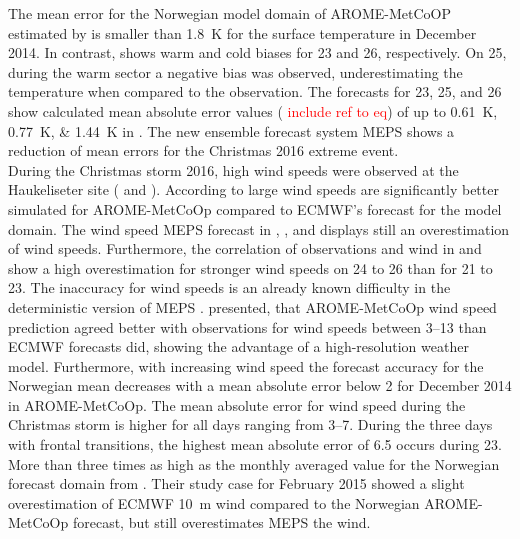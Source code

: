 The mean error for the Norwegian model domain of AROME-MetCoOP estimated by \citet{muller_arome-metcoop:_2017} is smaller than \SI{1.8}{\kelvin} for the surface temperature in December 2014. In contrast,  shows warm and cold biases for \num{23} and \SI{26}{\dec}, respectively. On \SI{25}{\dec}, during the warm sector a negative bias was observed, underestimating the temperature when compared to the observation.  The forecasts for \num{23}, \num{25}, and \SI{26}{\dec} show calculated mean absolute error values ( \textcolor{red}{include ref to eq}) of up to \SIlist{0.61;0.77;1.44}{\kelvin} in . The new ensemble forecast system MEPS shows a reduction of mean errors for the Christmas 2016 extreme event. 
\\
During the Christmas storm 2016, high wind speeds were observed at the Haukeliseter site ( and ).
According to \citet{muller_arome-metcoop:_2017} large wind speeds are significantly better simulated for AROME-MetCoOp compared to ECMWF's forecast for the model domain. The wind speed MEPS forecast in , , and  displays still an overestimation of wind speeds. Furthermore, the correlation of observations and wind in  and  show a high overestimation for stronger wind speeds on \num{24} to \SI{26}{\dec} than for \num{21} to \SI{23}{\dec}. The inaccuracy for wind speeds is an already known difficulty in the deterministic version of MEPS \citep{muller_arome-metcoop:_2017}. \citet{muller_arome-metcoop:_2017} presented, that AROME-MetCoOp wind speed prediction agreed better with observations for wind speeds between \SIrange{3}{13}{\mPs} than ECMWF forecasts did, showing the advantage of a high-resolution weather model. Furthermore, with increasing wind speed the forecast accuracy for the Norwegian mean decreases with a mean absolute error below \SI{2}{\mPs} for December 2014 in AROME-MetCoOp.
The mean absolute error for wind speed during the Christmas storm is higher for all days ranging from \SIrange{3}{7}{\mPs}.
During the three days with frontal transitions, the highest mean absolute error of \SI{6.5}{\mPs} occurs during \SI{23}{\dec}. More than three times as high as the monthly averaged value for the Norwegian forecast domain from \citet{muller_arome-metcoop:_2017}. Their study case for February 2015 showed a slight overestimation of ECMWF \SI{10}{\metre} wind compared to the Norwegian AROME-MetCoOp forecast, but still overestimates MEPS the wind.
